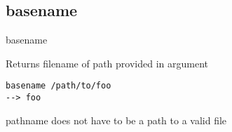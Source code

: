 \subsection{basename}

\begin{frame}[fragile]{basename}
  \begin{exampleblock}{Returns filename of path provided in argument}
    \begin{lstlisting}[showstringspaces=false]
basename /path/to/foo
--> foo
    \end{lstlisting}
  \end{exampleblock}
  \pause
pathname does not have to be a path to a valid file
\end{frame}

